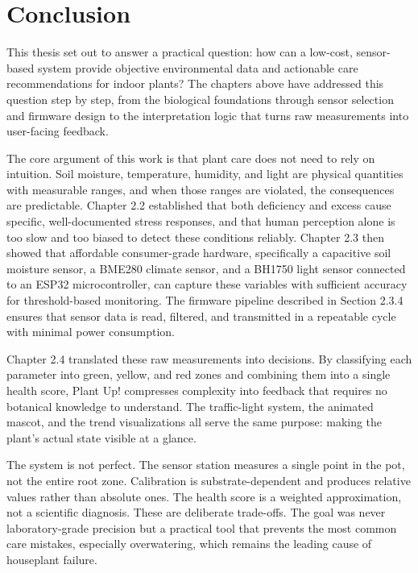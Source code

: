 \section{Conclusion}

This thesis set out to answer a practical question: how can a low-cost, sensor-based system provide objective environmental data and actionable care recommendations for indoor plants? The chapters above have addressed this question step by step, from the biological foundations through sensor selection and firmware design to the interpretation logic that turns raw measurements into user-facing feedback.

The core argument of this work is that plant care does not need to rely on intuition. Soil moisture, temperature, humidity, and light are physical quantities with measurable ranges, and when those ranges are violated, the consequences are predictable. Chapter 2.2 established that both deficiency and excess cause specific, well-documented stress responses, and that human perception alone is too slow and too biased to detect these conditions reliably. Chapter 2.3 then showed that affordable consumer-grade hardware, specifically a capacitive soil moisture sensor, a BME280 climate sensor, and a BH1750 light sensor connected to an ESP32 microcontroller, can capture these variables with sufficient accuracy for threshold-based monitoring. The firmware pipeline described in Section 2.3.4 ensures that sensor data is read, filtered, and transmitted in a repeatable cycle with minimal power consumption.

Chapter 2.4 translated these raw measurements into decisions. By classifying each parameter into green, yellow, and red zones and combining them into a single health score, Plant Up! compresses complexity into feedback that requires no botanical knowledge to understand. The traffic-light system, the animated mascot, and the trend visualizations all serve the same purpose: making the plant's actual state visible at a glance.

The system is not perfect. The sensor station measures a single point in the pot, not the entire root zone. Calibration is substrate-dependent and produces relative values rather than absolute ones. The health score is a weighted approximation, not a scientific diagnosis. These are deliberate trade-offs. The goal was never laboratory-grade precision but a practical tool that prevents the most common care mistakes, especially overwatering, which remains the leading cause of houseplant failure.

